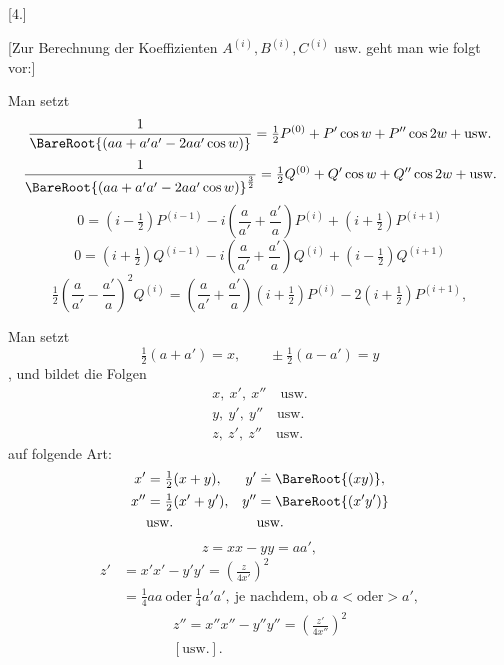 \par\bigskip
\hypertarget{native-390}{}
\begin{center}[4.]\end{center}
\noindent\hspace*{\parindent}[Zur Berechnung der Koeffizienten \(A^{(i)}, B^{(i)}, C^{(i)}\) usw. geht man wie folgt vor:]

Man setzt
\[
\frac{1}{\BareRoot{(aa+a'a'-2aa'\cos w)}}=\tfrac12P^{(0)}+P'\cos w+P''\cos2w+\text{usw.}
\]
\[
\frac{1}{\BareRoot{(aa+a'a'-2aa'\cos w)}^{\frac32}}=\tfrac12Q^{(0)}+Q'\cos w+Q''\cos2w+\text{usw.}
\]
\[
0=(i-\tfrac12)P^{(i-1)}-i\left(\frac a{a'}+\frac{a'}a\right)P^{(i)}+(i+\tfrac12)P^{(i+1)}
\]
\[
0=(i+\tfrac12)Q^{(i-1)}-i\left(\frac a{a'}+\frac{a'}a\right)Q^{(i)}+(i-\tfrac12)Q^{(i+1)}
\]
\[
\tfrac12\left(\frac a{a'}-\frac{a'}a\right)^2Q^{(i)}=\left(\frac a{a'}+\frac{a'}a\right)(i+\tfrac12)P^{(i)}-2(i+\tfrac12)P^{(i+1)},
\]

Man setzt
\[
\tfrac12(a+a')=x,\qquad\pm\tfrac12(a-a')=y
\]
, und bildet die Folgen
\[
\begin{gathered}
x,\ x',\ x''\quad\text{usw.}\\
y,\ y',\ y''\quad\text{usw.}\\
z,\ z',\ z''\quad\text{usw.}
\end{gathered}
\]
\noindent auf folgende Art:
\[
\begin{aligned}
x'&=\tfrac12(x+y),&y'&\overset{\scriptscriptstyle\boldsymbol{.}}{=}\BareRoot{(xy)},\\
x''&=\tfrac12(x'+y'),&y''&=\BareRoot{(x'y')}\\
&\text{usw.}&&\text{usw.}
\end{aligned}
\]
\[
z=xx-yy=aa',
\]
\[
\begin{aligned}
z'&=x'x'-y'y'=\left(\frac z{4x'}\right)^2\\
&=\tfrac14aa\ \text{oder}\ \tfrac14a'a',\ \text{je nachdem, ob}\ a<\text{oder}>a',
\end{aligned}
\]
\[
\begin{gathered}
z''=x''x''-y''y''=\left(\frac{z'}{4x''}\right)^2\\
[\text{usw.}].
\end{gathered}
\]

